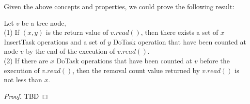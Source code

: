 Given the above concepts and properties, we could prove the following result:

\begin{lem}
Let $v$ be a tree node, \\
(1) If $(x, y)$ is the return value of $v.read( )$, then there exists a set of $x$ InsertTask operations and a set of $y$ DoTask operation that have been counted at node $v$ by the end of the execution of $v.read( )$.\\
\noindent (2) If there are $x$ DoTask operations that have been counted at $v$ before the execution of $v.read( )$, then the removal count value returned by $v.read( )$ is not less than $x$.
\end{lem}
\begin{proof}
TBD
\end{proof}



